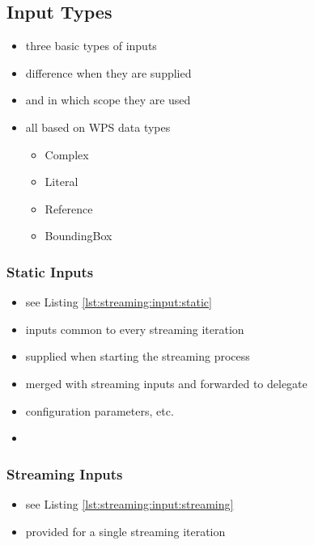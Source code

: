 	\subsection{Input Types}\label{sec:streaming:input-types}
		\begin{itemize}
			\item three basic types of inputs
			\item difference when they are supplied
			\item and in which scope they are used
			\item all based on WPS data types
			\begin{itemize}
				\item Complex
				\item Literal
				\item Reference
				\item BoundingBox
			\end{itemize}
		\end{itemize}
		\subsubsection{Static Inputs}
			\begin{itemize}
				\item see Listing \ref{lst:streaming:input:static}
				\item inputs common to every streaming iteration
				\item supplied when starting the streaming process
				\item merged with streaming inputs and forwarded to delegate
				\item configuration parameters, etc.
				\item
			\end{itemize}
		\subsubsection{Streaming Inputs}
			\begin{itemize}
				\item see Listing \ref{lst:streaming:input:streaming}
				\item provided for a single streaming iteration
			\end{itemize}

